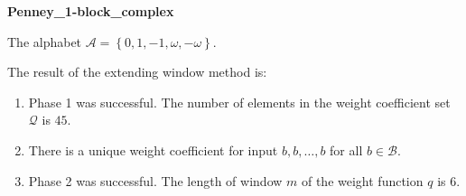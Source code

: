 \begin{exmp}
\textbf{ Penney\_1-block\_complex }

\label{ex:Penney1-blockcomplex}

The alphabet $\mathcal{A} =\left\{0, 1, -1, \omega, -\omega\right\}$.

The result of the extending window method is:
\begin{enumerate}
    \item Phase 1 was successful.
The number of elements in the weight coefficient set $\mathcal{Q}$ is $45$.

    \item There is a unique weight coefficient for input $b,b,\dots,b$ for all $b\in\mathcal{B}$.

    \item Phase 2 was successful.
The length of window $m$ of the weight function $q$ is 6.
\end{enumerate}
\end{exmp}
